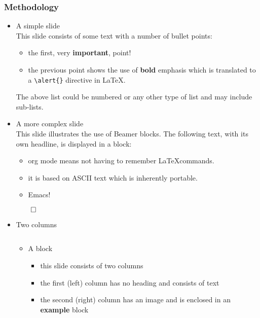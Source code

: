 \documentclass[bigger]{beamer}
\begin{document}
\begin{frame}[fragile]
\frametitle{Methodology}
\label{sec-2}
\begin{itemize}

\item A simple slide\\
\label{sec-2-1}%
This slide consists of some text with a number of bullet points:

\begin{itemize}
\item the first, very \textbf{important}, point!
\item the previous point shows the use of \textbf{bold} emphasis which is translated to a \texttt{\textbackslash{}alert\{\}} directive in \LaTeX.
\end{itemize}

The above list could be numbered or any other type of list and may include sub-lists.


\item A more complex slide\\
\label{sec-2-2}%
This slide illustrates the use of Beamer blocks.  The following text,
with its own headline, is displayed in a block:
\begin{theorem}
\label{sec-2-2-1}

\begin{itemize}
\item org mode means not having to remember \LaTeX commands.
\item it is based on ASCII text which is inherently portable.
\item Emacs!
\end{itemize}

    \hfill \(\qed\)
\end{theorem}

\item Two columns
\label{sec-2-3}%

\begin{columns}
\begin{column}{0.4\textwidth}
\begin{itemize}

\item A block
\label{sec-2-3-1}%
\begin{itemize}
\item this slide consists of two columns
\item the first (left) column has no heading and consists of text
\item the second (right) column has an image and is enclosed in an \textbf{example} block
\end{itemize}


\end{itemize}
\end{column}
\end{columns}
\end{itemize}
\end{frame}
\end{document}
